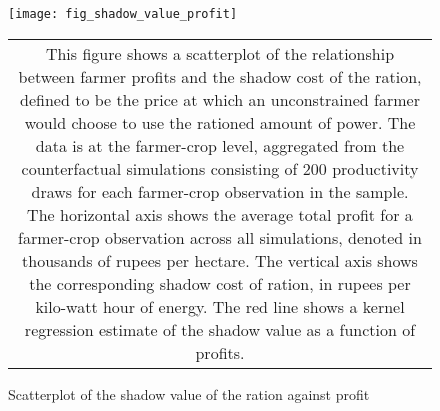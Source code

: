 \documentclass{article}
\numberwithin{table}{section}
\begin{document}
\renewcommand{\tabcolsep}{8pt}


\renewcommand{\tabcolsep}{10pt}


\renewcommand{\tabcolsep}{2pt}


\renewcommand{\tabcolsep}{8pt}










\clearpage

\begin{figure}
	\centering
	\caption{Scatterplot of the shadow value of the ration against profit}
	\texttt{[image: fig\_shadow\_value\_profit]}
	\begin{tabular*}{1.0\textwidth}{c}
		\multicolumn{1}{p{1.0\hsize}}{\footnotesize This figure shows a scatterplot of the relationship between farmer profits and the shadow cost of the ration, defined to be the price at which an unconstrained farmer would choose to use the rationed amount of power. The data is at the farmer-crop level, aggregated from the counterfactual simulations consisting of 200 productivity draws for each farmer-crop observation in the sample. The horizontal axis shows the average total profit for a farmer-crop observation across all simulations, denoted in thousands of rupees per hectare. The vertical axis shows the corresponding shadow cost of ration, in rupees per kilo-watt hour of energy. The red line shows a kernel regression estimate of the shadow value as a function of profits. }\\
	\end{tabular*}
\end{figure}
\end{document}
